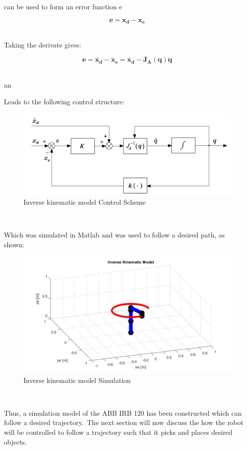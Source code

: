 \documentclass{UoNMCHA}
\numberwithin{equation}{section}
\begin{document}
can be used to form an error function e\

\begin{equation*}
\mathbf{e = x_d - x_e} 
\end{equation*}\

Taking the derivate gives:\

\begin{equation*}
\mathbf{\dot{e} = \dot{x_d} - \dot{x_e} = \dot{x_d} - J_A(q)\dot{q}} 
\end{equation*}\

an

Leads to the following control structure:\

\begin{figure}[ht]
	\begin{center}
		\includegraphics[width=.6\linewidth]{Figures/ode}
		\caption{Inverse kinematic model Control Scheme}
		\label{fig:ode}
	\end{center}
\end{figure}\

Which was simulated in Matlab and was used to follow a desired path, as shown:\

\begin{figure}[H]
	\begin{center}
		\includegraphics[width=.6\linewidth]{Figures/ikmodel}
		\caption{Inverse kinematic model Simulation}
		\label{fig:ikmodel}
	\end{center}
\end{figure}\

Thus, a simulation model of the ABB IRB 120 has been constructed which can follow a desired trajectory.\
The next section will now discuss the how the robot will be controlled to follow a trajectory such that it picks and places desired objects. 
\end{document}

